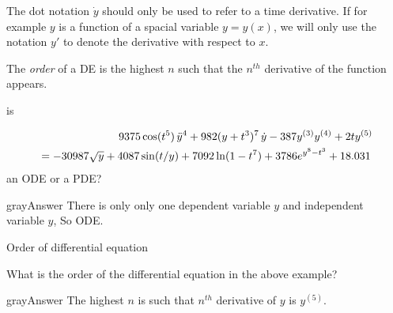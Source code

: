 \Warning The dot notation $\dot{y}$ should only be used to refer to a time derivative. If for example $y$ is a function of a spacial variable $y=y(x)$, we will only use the notation $y'$ to denote the derivative with respect to $x$.\\

\begin{mydef}
  The \emph{\color{blue} order} of a DE is the highest $n$ such that the $n^{th}$ derivative of the function appears.
\end{mydef}
\begin{exercise}
  is 
\end{exercise}
\begin{align*}
  \displaystyle  \displaystyle 9375 \cos (t^5) \, \ddot{y}^4 + 982 (y + t^3)^7 \,
  \dot{y} - 387 y^{(3)} y^{(4)} + 2t y^{(5)} \\
  \displaystyle {}=- 30987\sqrt {y}+ 4087 \sin (t/y) + 7092 \ln (1- t^7) + 3786 e^{y^8 - t^3} + 18.031 \,
\end{align*}
an ODE or a PDE?
\begin{mybox}{gray}{Answer}
  There is only only one dependent variable $y$ and independent variable $y$, So ODE.  
\end{mybox}
\clearpage

\begin{exercise}
  Order of differential equation 
\end{exercise}
What is the order of the differential equation in the above example?
\begin{mybox}{gray}{Answer}
  The highest $n$ is such that $n^{th}$ derivative of $y$ is $y^{(5)}$. 
\end{mybox}
\clearpage

